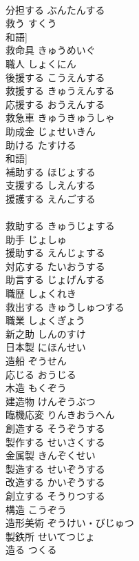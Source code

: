 \documentclass[8pt]{extreport}
\begin{document}
\begin{CJK}{UTF8}{min}
\\	分担する	ぶんたんする	
\\	救う	すくう	
\\	和語]
\\	救命具	きゅうめいぐ	
\\	職人	しょくにん	
\\	後援する	こうえんする	
\\	救援する	きゅうえんする	
\\	応援する	おうえんする	
\\	救急車	きゅうきゅうしゃ	
\\	助成金	じょせいきん	
\\	助ける	たすける	
\\	和語]
\\	補助する	ほじょする	
\\	支援する	しえんする	
\\	援護する	えんごする	
\\	[漢語]
\\	救助する	きゅうじょする	
\\	助手	じょしゅ	
\\	援助する	えんじょする	
\\	対応する	たいおうする	
\\	助言する	じょげんする	
\\	職歴	しょくれき	
\\	救出する	きゅうしゅつする	
\\	職業	しょくぎょう	
\\	新之助	しんのすけ	
\\	日本製	にほんせい	
\\	造船	ぞうせん	
\\	応じる	おうじる	
\\	木造	もくぞう	
\\	建造物	けんぞうぶつ	
\\	臨機応変	りんきおうへん	
\\	創造する	そうぞうする	
\\	製作する	せいさくする	
\\	金属製	きんぞくせい	
\\	製造する	せいぞうする	
\\	改造する	かいぞうする	
\\	創立する	そうりつする	
\\	構造	こうぞう	
\\	造形美術	ぞうけい・びじゅつ	
\\	製鉄所	せいてつじょ	
\\	造る	つくる	
\\	[和語]

\end{CJK}
\end{document}

